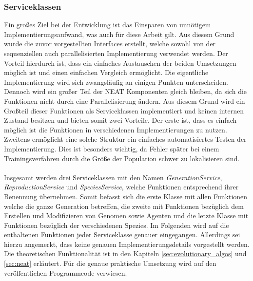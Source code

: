 \subsubsection{Serviceklassen}
Ein großes Ziel bei der Entwicklung ist das Einsparen von unnötigem Implementierungsaufwand, was auch für diese Arbeit gilt. Aus diesem Grund wurde die zuvor vorgestellten Interfaces erstellt, welche sowohl von der sequenziellen auch parallelisierten Implementierung verwendet werden. Der Vorteil hierdurch ist, dass ein einfaches Austauschen der beiden Umsetzungen möglich ist und einen einfachen Vergleich ermöglicht. Die eigentliche Implementierung wird sich zwangsläufig an einigen Punkten unterscheiden. Dennoch wird ein großer Teil der \ac{NEAT} Komponenten gleich bleiben, da sich die Funktionen nicht durch eine Parallelisierung ändern. Aus diesem Grund wird ein Großteil dieser Funktionen als Serviceklassen implementiert und keinen internen Zustand besitzen und bieten somit zwei Vorteile. Der erste ist, dass es einfach möglich ist die Funktionen in verschiedenen Implementierungen zu nutzen. Zweitens ermöglicht eine solche Struktur ein einfaches automatisiertes Testen der Implementierung. Dies ist besonders wichtig, da Fehler später bei einem Trainingsverfahren durch die Größe der Population schwer zu lokalisieren sind.
\\\\
Insgesamt werden drei Serviceklassen mit den Namen \emph{GenerationService}, \emph{ReproductionService} und \emph{SpeciesService}, welche Funktionen entsprechend ihrer Benennung übernehmen. Somit befasst sich die erste Klasse mit allen Funktionen welche die ganze Generation betreffen, die zweite mit Funktionen bezüglich dem Erstellen und Modifizieren von Genomen sowie Agenten und die letzte Klasse mit Funktionen bezüglich der verschiedenen Spezies. Im Folgenden wird auf die enthaltenen Funktionen jeder Serviceklasse genauer eingegangen. Allerdings sei hierzu angemerkt, dass keine genauen Implementierungsdetails vorgestellt werden. Die theoretischen Funktionalität ist in den Kapiteln \ref{sec:evolutionary_algos} und  \ref{sec:neat} erläutert. Für die genaue praktische Umsetzung wird auf den veröffentlichen Programmcode verwiesen.
\\\\
